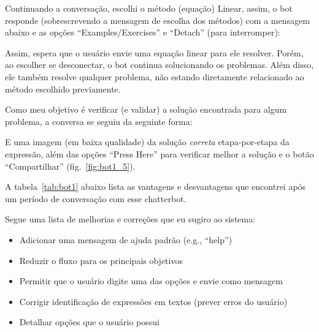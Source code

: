 

Continuando a conversação, escolhi o método (equação) Linear, assim, o bot responde (sobrescrevendo a mensagem de escolha dos métodos) com a mensagem abaixo e as opções ``Examples/Exercises'' e ``Detach'' (para interromper):
\begin{description}
    \item {}
\end{description}
Assim, espera que o usuário envie uma equação linear para ele resolver. Porém, ao escolher se desconectar, o bot continua solucionando os problemas. Além disso, ele também resolve qualquer problema, não estando diretamente relacionado ao método escolhido previamente.

Como meu objetivo é verificar (e validar) a solução encontrada para algum problema, a conversa se seguiu da seguinte forma:

E uma imagem (em baixa qualidade) da solução \emph{correta} etapa-por-etapa da expressão, além das opções ``Press Here'' para verificar melhor a solução e o botão ``Compartilhar'' (fig.~\ref{fig:bot1_5}).


A tabela~\ref{tab:bot1} abaixo lista as vantagens e desvantagens que encontrei após um período de conversação com esse chatterbot.


Segue uma lista de melhorias e correções que eu sugiro ao sistema:
\begin{itemize}[noitemsep]
    \item Adicionar uma mensagem de ajuda padrão (e.g., ``help'')
    \item Reduzir o fluxo para os principais objetivos
    \item Permitir que o usuário digite uma das opções e envie como mensagem
    \item Corrigir identificação de expressões em textos (prever erros do usuário)
    \item Detalhar opções que o usuário possui
\end{itemize}